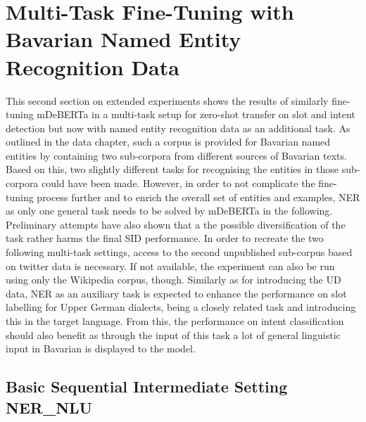 \documentclass[11pt,a4paper,twoside,openright]{scrbook}
\begin{document}
\section{Multi-Task Fine-Tuning with Bavarian Named Entity Recognition Data}

This second section on extended experiments shows the results of similarly fine-tuning mDeBERTa in a multi-task setup for zero-shot transfer on slot and intent detection but now with named entity recognition data as an additional task. As outlined in the data chapter, such a corpus is provided for Bavarian named entities by \citet{peng-etal-2024-sebastian-basti} containing two sub-corpora from different sources of Bavarian texts. Based on this, two slightly different tasks for recognising the entities in those sub-corpora could have been made. However, in order to not complicate the fine-tuning process further and to enrich the overall set of entities and examples, NER as only one general task needs to be solved by mDeBERTa in the following. Preliminary attempts have also shown that a the possible diversification of the task rather harms the final SID performance. In order to recreate the two following multi-task settings, access to the second unpublished sub-corpus based on twitter data is necessary. If not available, the experiment can also be run using only the Wikipedia corpus, though. Similarly as for introducing the UD data, NER as an auxiliary task is expected to enhance the performance on slot labelling for Upper German dialects, being a closely related task and introducing this in the target language. From this, the performance on intent classification should also benefit as through the input of this task a lot of general linguistic input in Bavarian is displayed to the model.







\subsection{Basic Sequential Intermediate Setting NER\_NLU}
\end{document}
